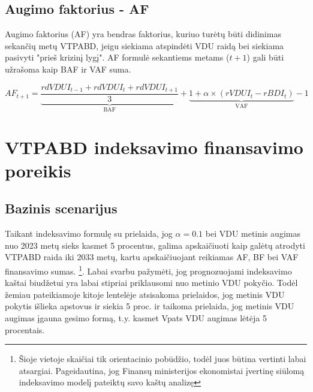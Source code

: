 \documentclass[titlepage, 11pt]{article}
\begin{document}
\newpage

\subsection{Augimo faktorius - AF}
Augimo faktorius (AF) yra bendras faktorius, kuriuo turėtų būti didinimas sekančių metų VTPABD, jeigu siekiama atspindėti VDU raidą bei siekiama pasivyti "prieš krizinį lygį". AF formulė sekantiems metams ($t+1$) gali būti užrašoma kaip BAF ir VAF suma.

\begin{equation}
AF_{t+1}=
\underbrace{
\frac{rdVDUI_{t-1}+rdVDUI_{t}+rdVDUI_{t+1}}{3}
}_\text{BAF}
+ 
\underbrace{1+ \alpha \times	(rVDUI_{t}-rBDI_{t})
}_\text{VAF}
-1
\end{equation}

\section{VTPABD indeksavimo finansavimo poreikis}

\subsection{Bazinis scenarijus}

Taikant indeksavimo formulę su prielaida, jog $\alpha=0.1$ bei VDU metinis augimas nuo 2023 metų sieks kasmet 5 procentus, galima apskaičiuoti kaip galėtų atrodyti VTPABD raida iki 2033 metų, kartu apskaičiuojant reikiamas AF, BF bei VAF finansavimo sumas. \footnote{Šioje vietoje skaičiai tik orientacinio pobūdžio, todėl juos būtina vertinti labai atsargiai. Pageidautina, jog Finansų ministerijos ekonomistai įvertinę siūlomą indeksavimo modelį pateiktų savo kaštų analizę}. Labai svarbu pažymėti, jog prognozuojami indeksavimo kaštai biudžetui yra labai stipriai priklausomi nuo metinio VDU pokyčio. Todėl žemiau pateikiamoje kitoje lentelėje atsisakoma prielaidos, jog metinis VDU pokytis išlieka apstovus ir siekia 5 proc. ir taikoma prielaida, jog metinis VDU augimas įgauna gesimo formą, t.y. kasmet Vpats VDU augimas lėtėja 5 procentais.
\end{document}
